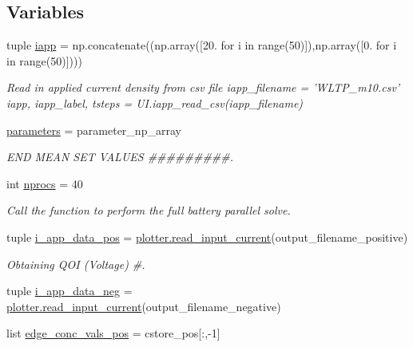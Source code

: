 \subsection*{Variables}
\begin{DoxyCompactItemize}
\item 
tuple \hyperlink{namespace_uncertainty___propagation_a32f0308fa61c28532eb593947e7b3fe0}{iapp} = np.\-concatenate((np.\-array(\mbox{[}20. for i in range(50)\mbox{]}),np.\-array(\mbox{[}0. for i in range(50)\mbox{]})))
\begin{DoxyCompactList}\small\item\em Read in applied current density from csv file iapp\-\_\-filename = 'W\-L\-T\-P\-\_\-m10.\-csv' iapp, iapp\-\_\-label, tsteps = U\-I.\-iapp\-\_\-read\-\_\-csv(iapp\-\_\-filename) \end{DoxyCompactList}\item 
\hyperlink{namespace_uncertainty___propagation_ad827090038061f4a04a789ab61df8c1d}{parameters} = parameter\-\_\-np\-\_\-array
\begin{DoxyCompactList}\small\item\em E\-N\-D M\-E\-A\-N S\-E\-T V\-A\-L\-U\-E\-S \#\#\#\#\#\#\#\#\#. \end{DoxyCompactList}\item 
int \hyperlink{namespace_uncertainty___propagation_ad7c4c17cf720ee538e27c02ab356ed6b}{nprocs} = 40
\begin{DoxyCompactList}\small\item\em Call the function to perform the full battery parallel solve. \end{DoxyCompactList}\item 
tuple \hyperlink{namespace_uncertainty___propagation_aa34db849c2abe725ec1b080fb93b0249}{i\-\_\-app\-\_\-data\-\_\-pos} = \hyperlink{namespaceplotter_ac4584f2efde622b7fe9e2b77b97b3089}{plotter.\-read\-\_\-input\-\_\-current}(output\-\_\-filename\-\_\-positive)
\begin{DoxyCompactList}\small\item\em Obtaining Q\-O\-I (Voltage) \#. \end{DoxyCompactList}\item 
tuple \hyperlink{namespace_uncertainty___propagation_af0c0656dcb2e67c34296832b7bf7a499}{i\-\_\-app\-\_\-data\-\_\-neg} = \hyperlink{namespaceplotter_ac4584f2efde622b7fe9e2b77b97b3089}{plotter.\-read\-\_\-input\-\_\-current}(output\-\_\-filename\-\_\-negative)
\item 
list \hyperlink{namespace_uncertainty___propagation_a2e425dd5abbd47ca217c22c04bb45c3e}{edge\-\_\-conc\-\_\-vals\-\_\-pos} = cstore\-\_\-pos\mbox{[}\-:,-\/1\mbox{]}

\end{DoxyCompactItemize}
